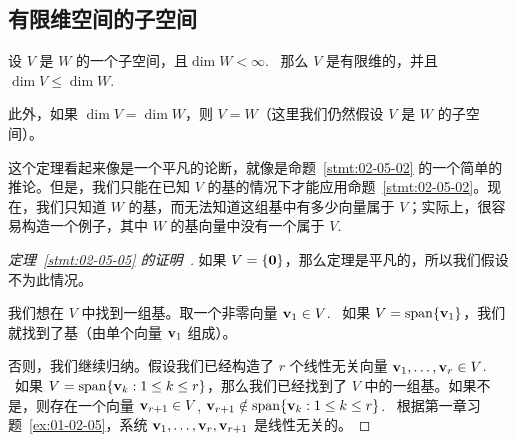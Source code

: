 \subsection{有限维空间的子空间}\label{sec:02-05-02}

\begin{theorem}\label{stmt:02-05-05}  设 $V$ 是 $W$ 的一个子空间，且$\dim W < \infty$. ~那么 $V$ 是有限维的，并且 $\dim V \le \dim W$. ~

此外，如果 $\dim V = \dim W$，则 $V = W$（这里我们仍然假设 $V$ 是 $W$ 的子空间）。\end{theorem}

\begin{remark*}
这个定理看起来像是一个平凡的论断，就像是命题~\ref{stmt:02-05-02} 的一个简单的推论。但是，我们只能在已知 $V$ 的基的情况下才能应用命题~\ref{stmt:02-05-02}。现在，我们只知道 $W$ 的基，而无法知道这组基中有多少向量属于 $V$；实际上，很容易构造一个例子，其中 $W$ 的基向量中没有一个属于 $V$. ~
\end{remark*}

\begin{proof}[\normalfont\heiti 定理~\ref{stmt:02-05-05} 的证明~\nopunct]如果 $V = \{\mathbf{0}\}$，那么定理是平凡的，所以我们假设不为此情况。

我们想在 $V$ 中找到一组基。取一个非零向量 $\mathbf{v}_1 \in V$. ~如果 $V = \operatorname{span}\{\mathbf{v}_1\}$，我们就找到了基（由单个向量 $\mathbf{v}_1$ 组成）。

否则，我们继续归纳。假设我们已经构造了 $r$ 个线性无关向量 $\mathbf{v}_1, \dots, \mathbf{v}_r \in V$. ~如果 $V = \operatorname{span}\{\mathbf{v}_k : 1 \le k \le r\}$，那么我们已经找到了 $V$ 中的一组基。如果不是，则存在一个向量 $\mathbf{v}_{r+1} \in V$, $\mathbf{v}_{r+1} \notin \operatorname{span}\{\mathbf{v}_k : 1 \le k \le r\}$. ~根据第一章习题~\ref{ex:01-02-05}，系统 $\mathbf{v}_1, \dots, \mathbf{v}_r, \mathbf{v}_{r+1}$ 是线性无关的。\end{proof}



